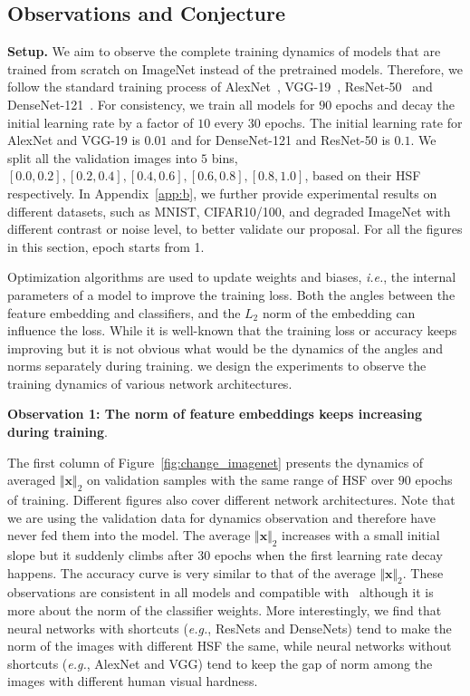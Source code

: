 \subsection{Observations and Conjecture}
\label{sec:discovery}

\textbf{Setup.} We aim to observe the complete training dynamics of models that are trained from scratch on ImageNet instead of the pretrained models. Therefore, we follow the standard training process of AlexNet~\cite{krizhevsky2012imagenet}, VGG-19~\cite{simonyan2014very}, ResNet-50~\cite{he2016deep} and DenseNet-121~\cite{huang2017densely}. For consistency, we train all models for $90$ epochs and decay the initial learning rate by a factor of $10$ every $30$ epochs. The initial learning rate for AlexNet and VGG-19 is $0.01$ and for DenseNet-121 and ResNet-50 is $0.1$. We split all the validation images into $5$ bins, $[0.0, 0.2], [0.2, 0.4], [0.4, 0.6], [0.6, 0.8], [0.8, 1.0]$, based on their HSF respectively. In Appendix~\ref{app:b}, we further provide experimental results on different datasets, such as MNIST, CIFAR10/100, and degraded ImageNet with different contrast or noise level, to better validate our proposal. For all the figures in this section, epoch starts from 1.

Optimization algorithms are used to update weights and biases, \emph{i.e.}, the internal parameters of a model to improve the training loss. Both the angles between the feature embedding and classifiers, and the $L_2$ norm of the embedding can influence the loss. While it is well-known that the training loss or accuracy keeps improving but it is not obvious what would be the dynamics of the angles and norms separately during training. we design the experiments to observe the training dynamics of various network architectures.

\textbf{Observation 1: The norm of feature embeddings keeps increasing during training}. 

The first column of Figure~\ref{fig:change_imagenet} presents the dynamics of averaged $\Vert \bm{x} \Vert_2$ on validation samples with the same range of HSF over $90$ epochs of training. Different figures also cover different network architectures. Note that we are using the validation data for dynamics observation and therefore have never fed them into the model. The average $\Vert \bm{x} \Vert_2$ increases with a small initial slope but it suddenly climbs after 30 epochs when the first learning rate decay happens. The accuracy curve is very similar to that of the average $\Vert \bm{x} \Vert_2$. These observations are consistent in all models and compatible with~\cite{soudry2018implicit} although it is more about the norm of the classifier weights. More interestingly, we find that neural networks with shortcuts (\emph{e.g.}, ResNets and DenseNets) tend to make the norm of the images with different HSF the same, while neural networks without shortcuts (\emph{e.g.}, AlexNet and VGG) tend to keep the gap of norm among the images with different human visual hardness.

